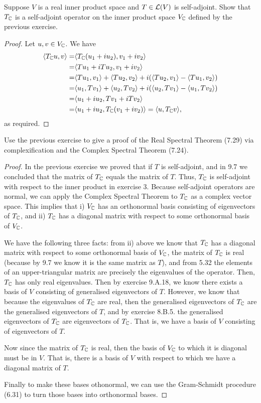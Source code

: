 \begin{exercise}{4}
  Suppose $V$ is a real inner product space and $T\in\mathcal{L}(V)$ is self-adjoint. Show that $T_{\mathbb{C}}$ is a self-adjoint operator on the inner product space $V_{\mathbb{C}}$ defined by the previous exercise.
\end{exercise}
\begin{proof}
 Let $u,v\in V_{\mathbb{C}}$. We have
 \begin{align*}
     \langle T_{\mathbb{C}} u,v\rangle =& \langle T_{\mathbb{C}}(u_1+iu_2),v_1+iv_2\rangle\\
     =& \langle Tu_1+iTu_2,v_1+iv_2\rangle\\
     =& \langle Tu_1,v_1\rangle+\langle Tu_2,v_2\rangle
     +i(\langle Tu_2,v_1\rangle-\langle Tu_1,v_2\rangle)\\
     =& \langle u_1,Tv_1\rangle+\langle u_2,Tv_2\rangle
     +i(\langle u_2,Tv_1\rangle-\langle u_1,Tv_2\rangle)\\
     =& \langle u_1+iu_2,Tv_1+iTv_2\rangle\\
     =& \langle u_1+iu_2,T_{\mathbb{C}}(v_1+iv_2)\rangle = \langle u,T_{\mathbb{C}} v\rangle,
 \end{align*}
 as required.
\end{proof}

\begin{exercise}{5}
  Use the previous exercise to give a proof of the Real Spectral Theorem (7.29) via complexification and the Complex Spectral Theorem (7.24).
\end{exercise}
\begin{proof}
 In the previous exercise we proved that if $T$ is self-adjoint, and in 9.7 we concluded that the matrix of $T_{\mathbb{C}}$ equals the matrix of $T$. Thus, $T_{\mathbb{C}}$ is self-adjoint with respect to the inner product in exercise 3. Because self-adjoint operators are normal, we can apply the Complex Spectral Theorem to $T_{\mathbb{C}}$ as a complex vector space. This implies that i) $V_{\mathbb{C}}$ has an orthonormal basis consisting of eigenvectors of $T_{\mathbb{C}}$, and ii) $T_{\mathbb{C}}$ has a diagonal matrix with respect to some orthonormal basis of $V_{\mathbb{C}}$. 

 We have the following three facts: from ii) above we know that $T_{\mathbb{C}}$ has a diagonal matrix with respect to some orthonormal basis of $V_{\mathbb{C}}$, the matrix of $T_{\mathbb{C}}$ is real (because by 9.7 we know it is the same matrix as $T$), and from 5.32 the elements of an upper-triangular matrix are precisely the eigenvalues of the operator. Then, $T_{\mathbb{C}}$ has only real eigenvalues. Then by exercise 9.A.18, we know there exists a basis of $V$ consisting of generalised eigenvectors of $T$. However, we know that because the eigenvalues of $T_{\mathbb{C}}$ are real, then the generalised eigenvectors of $T_{\mathbb{C}}$ are the generalised eigenvectors of $T$, and by exercise 8.B.5. the generalised eigenvectors of $T_{\mathbb{C}}$ are eigenvectors of $T_{\mathbb{C}}$. That is, we have a basis of $V$ consisting of eigenvectors of $T$.

 Now since the matrix of $T_{\mathbb{C}}$ is real, then the basis of $V_{\mathbb{C}}$ to which it is diagonal must be in $V$. That is, there is a basis of $V$ with respect to which we have a diagonal matrix of $T$.

 Finally to make these bases othonormal, we can use the Gram-Schmidt procedure (6.31) to turn those bases into orthonormal bases.
\end{proof}